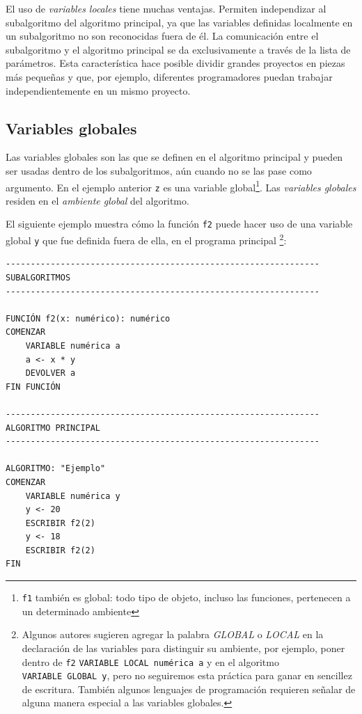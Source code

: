 \documentclass[
]{book}
\begin{document}
El uso de \emph{variables locales} tiene muchas ventajas. Permiten independizar al subalgoritmo del algoritmo principal, ya que las variables definidas localmente en un subalgoritmo no son reconocidas fuera de él. La comunicación entre el subalgoritmo y el algoritmo principal se da exclusivamente a través de la lista de parámetros. Esta característica hace posible dividir grandes proyectos en piezas más pequeñas y que, por ejemplo, diferentes programadores puedan trabajar independientemente en un mismo proyecto.

\hypertarget{variables-globales}{%
\subsection{Variables globales}\label{variables-globales}}

Las variables globales son las que se definen en el algoritmo principal y pueden ser usadas dentro de los subalgoritmos, aún cuando no se las pase como argumento. En el ejemplo anterior \texttt{z} es una variable global\footnote{\texttt{f1} también es global: todo tipo de objeto, incluso las funciones, pertenecen a un determinado ambiente}. Las \emph{variables globales} residen en el \emph{ambiente global} del algoritmo.

El siguiente ejemplo muestra cómo la función \texttt{f2} puede hacer uso de una variable global \texttt{y} que fue definida fuera de ella, en el programa principal
\footnote{Algunos autores sugieren agregar la palabra \emph{GLOBAL} o \emph{LOCAL} en la declaración de las variables para distinguir su ambiente, por ejemplo, poner dentro de \texttt{f2} \texttt{VARIABLE\ LOCAL\ numérica\ a} y en el algoritmo \texttt{VARIABLE\ GLOBAL\ y}, pero no seguiremos esta práctica para ganar en sencillez de escritura. También algunos lenguajes de programación requieren señalar de alguna manera especial a las variables globales.}:

\begin{verbatim}
---------------------------------------------------------------
SUBALGORITMOS
---------------------------------------------------------------

FUNCIÓN f2(x: numérico): numérico
COMENZAR
    VARIABLE numérica a
    a <- x * y
    DEVOLVER a
FIN FUNCIÓN

---------------------------------------------------------------
ALGORITMO PRINCIPAL
---------------------------------------------------------------

ALGORITMO: "Ejemplo"
COMENZAR
    VARIABLE numérica y
    y <- 20
    ESCRIBIR f2(2)
    y <- 18
    ESCRIBIR f2(2)
FIN
\end{verbatim}
\end{document}
